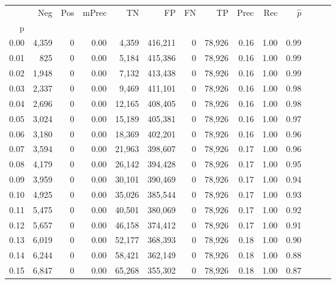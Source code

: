 \begin{tabular}{rrrrrrrrrrrrrr}
\toprule
{} &    Neg &    Pos & mPrec &       TN &       FP &      FN &      TP &  Prec &   Rec & $\hat{p}$ \\
p    &        &        &       &          &          &         &         &       &       &           \\
\midrule
0.00 &  4,359 &      0 &  0.00 &    4,359 &  416,211 &       0 &  78,926 &  0.16 &  1.00 &      0.99 \\
0.01 &    825 &      0 &  0.00 &    5,184 &  415,386 &       0 &  78,926 &  0.16 &  1.00 &      0.99 \\
0.02 &  1,948 &      0 &  0.00 &    7,132 &  413,438 &       0 &  78,926 &  0.16 &  1.00 &      0.99 \\
0.03 &  2,337 &      0 &  0.00 &    9,469 &  411,101 &       0 &  78,926 &  0.16 &  1.00 &      0.98 \\
0.04 &  2,696 &      0 &  0.00 &   12,165 &  408,405 &       0 &  78,926 &  0.16 &  1.00 &      0.98 \\
0.05 &  3,024 &      0 &  0.00 &   15,189 &  405,381 &       0 &  78,926 &  0.16 &  1.00 &      0.97 \\
0.06 &  3,180 &      0 &  0.00 &   18,369 &  402,201 &       0 &  78,926 &  0.16 &  1.00 &      0.96 \\
0.07 &  3,594 &      0 &  0.00 &   21,963 &  398,607 &       0 &  78,926 &  0.17 &  1.00 &      0.96 \\
0.08 &  4,179 &      0 &  0.00 &   26,142 &  394,428 &       0 &  78,926 &  0.17 &  1.00 &      0.95 \\
0.09 &  3,959 &      0 &  0.00 &   30,101 &  390,469 &       0 &  78,926 &  0.17 &  1.00 &      0.94 \\
0.10 &  4,925 &      0 &  0.00 &   35,026 &  385,544 &       0 &  78,926 &  0.17 &  1.00 &      0.93 \\
0.11 &  5,475 &      0 &  0.00 &   40,501 &  380,069 &       0 &  78,926 &  0.17 &  1.00 &      0.92 \\
0.12 &  5,657 &      0 &  0.00 &   46,158 &  374,412 &       0 &  78,926 &  0.17 &  1.00 &      0.91 \\
0.13 &  6,019 &      0 &  0.00 &   52,177 &  368,393 &       0 &  78,926 &  0.18 &  1.00 &      0.90 \\
0.14 &  6,244 &      0 &  0.00 &   58,421 &  362,149 &       0 &  78,926 &  0.18 &  1.00 &      0.88 \\
0.15 &  6,847 &      0 &  0.00 &   65,268 &  355,302 &       0 &  78,926 &  0.18 &  1.00 &      0.87 \\

\end{tabular}
